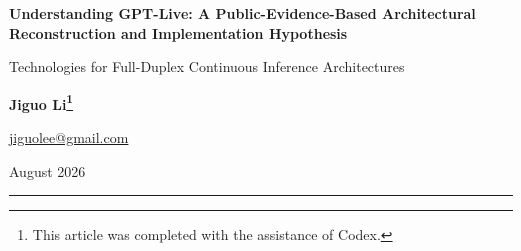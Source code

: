 \documentclass[UTF8,fontset=none,a4paper,10pt]{ctexart}
\begin{document}
\begin{center}
 {\bfseries\color{navy} Understanding GPT-Live: A Public-Evidence-Based Architectural Reconstruction and Implementation Hypothesis}\par
  \vspace{4pt}
 {\color{navy} Technologies for Full-Duplex Continuous Inference Architectures}\par
  \vspace{10pt}
 {\normalsize\textbf{Jiguo Li\footnote{This article was completed with the assistance of Codex.}}}\par
  \vspace{2pt}
  {\small\href{mailto:jiguolee@gmail.com}{jiguolee@gmail.com}}\par
  \vspace{2pt}
{\small August 2026}
\end{center}
\vspace{5pt}
\hrule
\end{document}
